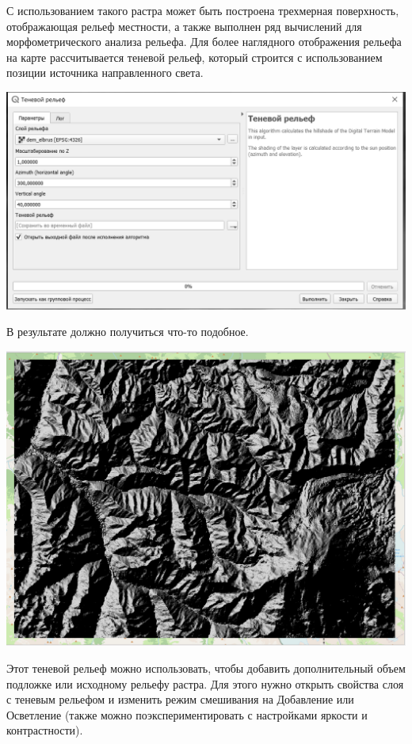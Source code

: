 \documentclass[
]{book}
\begin{document}
С использованием такого растра может быть построена трехмерная поверхность, отображающая рельеф местности, а также выполнен ряд вычислений для морфометрического анализа рельефа. Для более наглядного отображения рельефа на карте рассчитывается теневой рельеф, который строится с использованием позиции источника направленного света.

\includegraphics{figures/69.png}

В результате должно получиться что-то подобное.

\includegraphics{figures/70.PNG}

Этот теневой рельеф можно использовать, чтобы добавить дополнительный объем подложке или исходному рельефу растра. Для этого нужно открыть свойства слоя с теневым рельефом и изменить режим смешивания на Добавление или Осветление (также можно поэкспериментировать с настройками яркости и контрастности).
\end{document}
